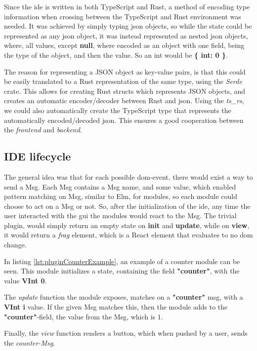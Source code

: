 Since the \gls*{ide} is written in both TypeScript and Rust, a method of encoding
type information when crossing between the TypeScript and Rust environment was
needed. It was achieved by simply typing \gls*{json} objects, so while the state
could be represented as any \gls*{json} object, it was instead represented as
nested \gls*{json} objects, where, all values, except \textbf{null}, where
encoded as an object with one field, being the type of the object, and then the
value. So an int would be \textbf{\{ int: 0 \}}.

The reason for representing a JSON object as key-value pairs, is that this could
be easily translated to a Rust representation of the same type, using the
\textit{Serde} crate. This allows for creating Rust structs which represents
JSON objects, and creates an automatic encoder/decoder between Rust and
\gls*{json}. Using the \textit{ts\_rs}, we could also automatically create the
TypeScript type that represents the automatically encoded/decoded \gls*{json}.
This ensures a good cooperation between the \textit{frontend} and
\textit{backend}.

\subsection{IDE lifecycle}

The general idea was that for each possible \gls*{dom}-event, there would exist a
way to send a Msg. Each Msg contains a Msg name, and some value, which enabled
pattern matching on Msg, similar to Elm, for modules, so each module could
choose to act on a Msg or not. So, after the initialization of the \gls*{ide},
any time the user interacted with the \gls*{gui} the modules would react to the
Msg. The trivial plugin, would simply return an empty state on \textbf{init} and
\textbf{update}, while on \textbf{view}, it would return a \textit{frag}
element, which is a React element that evaluates to no \gls*{dom} change.

In listing \ref{lst:pluginCounterExample}, an example of a counter module can be
seen. This module initializes a state, containing the field \textbf{"counter"},
with the value \textbf{VInt 0}.

The \textit{update} function the module exposes, matches on a \textbf{"counter"}
msg, with a \textbf{VInt i} value. If the given Msg matches this, then the
module adds to the \textbf{"counter"}-field, the value from the Msg, which is
$1$.

Finally, the \textit{view} function renders a button, which when pushed by a
user, sends the \textit{counter-Msg}.

